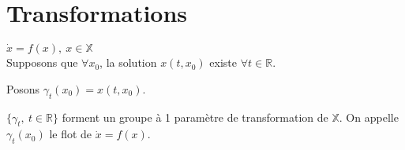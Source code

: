 \section{Transformations}
$\dot{x}=f(x),\ x\in\mathbb{X}$\\
Supposons que $\forall x_0$, la solution $x(t,x_0)$ existe $\forall t\in\mathbb{R}$. 

\bigskip
Posons $\gamma_t(x_0)=x(t,x_0)$. 

$\{\gamma_t,\ t\in\mathbb{R}\}$ forment un groupe à 1 paramètre de transformation de $\mathbb{X}$. On appelle $\gamma_t(x_0)$ le flot de $\dot{x}=f(x)$.
